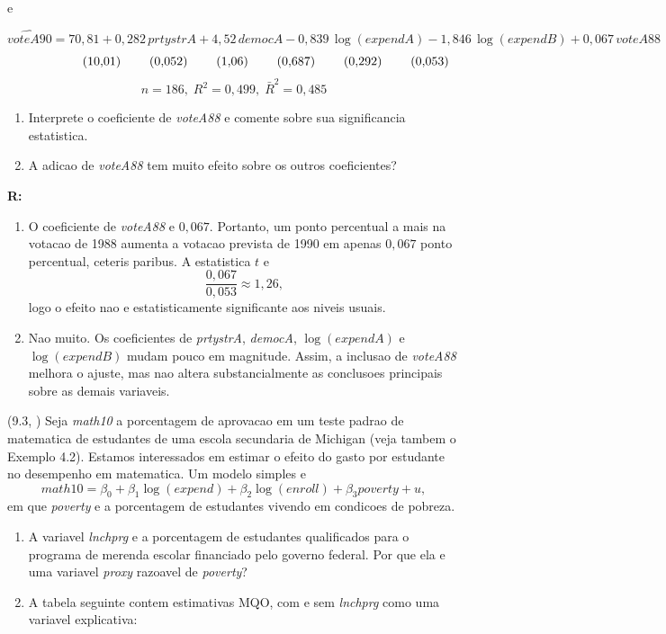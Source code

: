 \documentclass[12pt,letterpaper, onecolumn]{exam}
\renewenvironment{solution}
{\par\noindent\textbf{R:}\enspace\color{blue}}
{\par\color{black}}
\begin{document}
\begin{questions}
e

\[
\widehat{voteA90}=70{,}81+0{,}282\,prtystrA+4{,}52\,democA-0{,}839\,\log(expendA)-1{,}846\,\log(expendB)+0{,}067\,voteA88
\]
\[
\hspace{1.8cm}(10{,}01)\hspace{0.8cm}(0{,}052)\hspace{0.8cm}(1{,}06)\hspace{0.8cm}(0{,}687)\hspace{0.8cm}(0{,}292)\hspace{0.8cm}(0{,}053)
\]
\[
n=186,\; R^2=0{,}499,\; \bar{R}^2=0{,}485
\]

\begin{enumerate}[label=(\roman*)]
    \item Interprete o coeficiente de \textit{voteA88} e comente sobre sua significancia estatistica.
    \item A adicao de \textit{voteA88} tem muito efeito sobre os outros coeficientes?
\end{enumerate}

\begin{solution}
\begin{enumerate}[label=(\roman*)]
    \item O coeficiente de \textit{voteA88} e \(0,067\). Portanto, um ponto percentual a mais na votacao de 1988 aumenta a votacao prevista de 1990 em apenas \(0,067\) ponto percentual, ceteris paribus. A estatistica \(t\) e
    \[
    \frac{0,067}{0,053}\approx 1,26,
    \]
    logo o efeito nao e estatisticamente significante aos niveis usuais.

    \item Nao muito. Os coeficientes de \textit{prtystrA}, \textit{democA}, \(\log(expendA)\) e \(\log(expendB)\) mudam pouco em magnitude. Assim, a inclusao de \textit{voteA88} melhora o ajuste, mas nao altera substancialmente as conclusoes principais sobre as demais variaveis.
\end{enumerate}
\end{solution}

\vspace{0.7cm}

\question (9.3, \citep{wooldridge2016}) Seja \textit{math10} a porcentagem de aprovacao em um teste padrao de matematica de estudantes de uma escola secundaria de Michigan (veja tambem o Exemplo 4.2). Estamos interessados em estimar o efeito do gasto por estudante no desempenho em matematica. Um modelo simples e
\[
math10=\beta_0+\beta_1\log(expend)+\beta_2\log(enroll)+\beta_3 poverty+u,
\]
em que \textit{poverty} e a porcentagem de estudantes vivendo em condicoes de pobreza.
\begin{enumerate}[label=(\roman*)]
    \item A variavel \textit{lnchprg} e a porcentagem de estudantes qualificados para o programa de merenda escolar financiado pelo governo federal. Por que ela e uma variavel \textit{proxy} razoavel de \textit{poverty}?
    \item A tabela seguinte contem estimativas MQO, com e sem \textit{lnchprg} como uma variavel explicativa:
\end{enumerate}


\end{questions}
\end{document}
